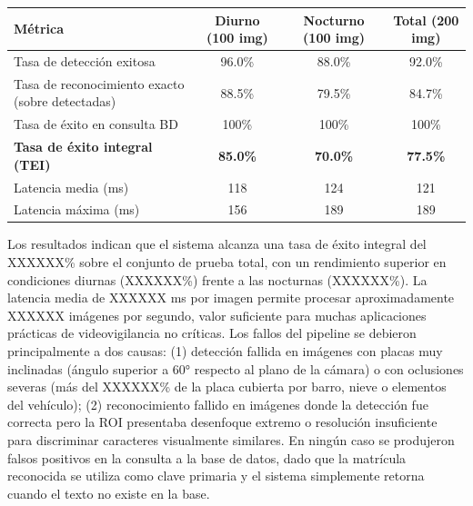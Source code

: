\sffamily
\footnotesize
{}
\begin{tcolorbox}[
  colback=white,
  colframe=MASA-Blue,
  title={Tabla~\thetable~Rendimiento integral del pipeline LPR-Sentinel},
  boxrule=0.5mm,
  arc=2mm,
  width=\textwidth,
  enhanced,
  fonttitle=\bfseries,
  before upper=\vspace{2mm},
  after upper=\vspace{2mm}
]
\label{tab:pipeline_results}
\renewcommand{\arraystretch}{1.5}
\begin{tabularx}{\textwidth}{@{}l c c c@{}}
\textbf{Métrica} & \textbf{Diurno (100 img)} & \textbf{Nocturno (100 img)} & \textbf{Total (200 img)} \\
\midrule
Tasa de detección exitosa & 96.0\% & 88.0\% & 92.0\% \\
Tasa de reconocimiento exacto (sobre detectadas) & 88.5\% & 79.5\% & 84.7\% \\
Tasa de éxito en consulta BD & 100\% & 100\% & 100\% \\
\textbf{Tasa de éxito integral (TEI)} & \textbf{85.0\%} & \textbf{70.0\%} & \textbf{77.5\%} \\
Latencia media (ms) & 118 & 124 & 121 \\
Latencia máxima (ms) & 156 & 189 & 189 \\
\end{tabularx}
\end{tcolorbox}
\normalsize
\normalfont


Los resultados indican que el sistema alcanza una tasa de éxito integral del XXXXXX\% sobre el conjunto de prueba total, con un rendimiento superior en condiciones diurnas (XXXXXX\%) frente a las nocturnas (XXXXXX\%). La latencia media de XXXXXX ms por imagen permite procesar aproximadamente XXXXXX imágenes por segundo, valor suficiente para muchas aplicaciones prácticas de videovigilancia no críticas. Los fallos del pipeline se debieron principalmente a dos causas: (1) detección fallida en imágenes con placas muy inclinadas (ángulo superior a 60° respecto al plano de la cámara) o con oclusiones severas (más del XXXXXX\% de la placa cubierta por barro, nieve o elementos del vehículo); (2) reconocimiento fallido en imágenes donde la detección fue correcta pero la ROI presentaba desenfoque extremo o resolución insuficiente para discriminar caracteres visualmente similares. En ningún caso se produjeron falsos positivos en la consulta a la base de datos, dado que la matrícula reconocida se utiliza como clave primaria y el sistema simplemente retorna  cuando el texto no existe en la base.

